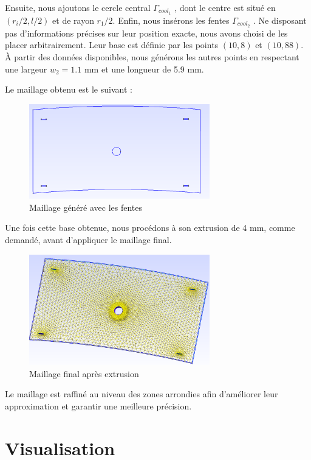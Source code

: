 \documentclass{article}
\begin{document}
Ensuite, nous ajoutons le cercle central \textit{\( \Gamma_{cool_1} \) }, dont le centre est situé en \( (r_i/2, l/2) \) et de rayon \( r_1/2 \). Enfin, nous insérons les fentes \textit{\( \Gamma_{cool_2} \) }. Ne disposant pas d’informations précises sur leur position exacte, nous avons choisi de les placer arbitrairement. Leur base est définie par les points \((10,8)\) et \((10,88)\). À partir des données disponibles, nous générons les autres points en respectant une largeur \( w_2 = 1.1 \) mm et une longueur de 5.9 mm. 

Le maillage obtenu est le suivant :

\begin{figure}[H]
    \centering
    \includegraphics[width=0.7\textwidth]{images/gmsh_2.png}
    \caption{Maillage généré avec les fentes}
\end{figure}

Une fois cette base obtenue, nous procédons à son extrusion de 4 mm, comme demandé, avant d'appliquer le maillage final.

\begin{figure}[H]
    \centering
    \includegraphics[width=0.7\textwidth]{images/gmsh_3.png}
    \caption{Maillage final après extrusion}
\end{figure}

Le maillage est raffiné au niveau des zones arrondies afin d'améliorer leur approximation et garantir une meilleure précision.

\section{Visualisation}
\end{document}
